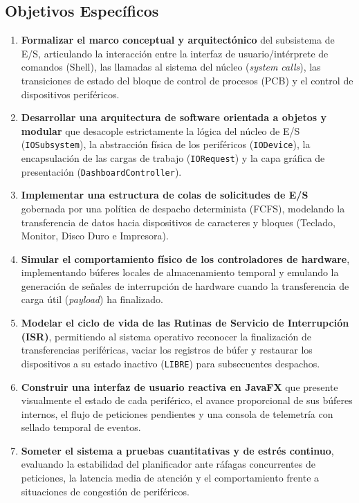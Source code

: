 \documentclass[11pt,letterpaper]{article}
\begin{document}
\subsection{Objetivos Específicos}
\begin{enumerate}
    \item \textbf{Formalizar el marco conceptual y arquitectónico} del subsistema de E/S, articulando la interacción entre la interfaz de usuario/intérprete de comandos (Shell), las llamadas al sistema del núcleo (\textit{system calls}), las transiciones de estado del bloque de control de procesos (PCB) y el control de dispositivos periféricos.
    \item \textbf{Desarrollar una arquitectura de software orientada a objetos y modular} que desacople estrictamente la lógica del núcleo de E/S (\texttt{IOSubsystem}), la abstracción física de los periféricos (\texttt{IODevice}), la encapsulación de las cargas de trabajo (\texttt{IORequest}) y la capa gráfica de presentación (\texttt{DashboardController}).
    \item \textbf{Implementar una estructura de colas de solicitudes de E/S} gobernada por una política de despacho determinista (FCFS), modelando la transferencia de datos hacia dispositivos de caracteres y bloques (Teclado, Monitor, Disco Duro e Impresora).
    \item \textbf{Simular el comportamiento físico de los controladores de hardware}, implementando búferes locales de almacenamiento temporal y emulando la generación de señales de interrupción de hardware cuando la transferencia de carga útil (\textit{payload}) ha finalizado.
    \item \textbf{Modelar el ciclo de vida de las Rutinas de Servicio de Interrupción (ISR)}, permitiendo al sistema operativo reconocer la finalización de transferencias periféricas, vaciar los registros de búfer y restaurar los dispositivos a su estado inactivo (\texttt{LIBRE}) para subsecuentes despachos.
    \item \textbf{Construir una interfaz de usuario reactiva en JavaFX} que presente visualmente el estado de cada periférico, el avance proporcional de sus búferes internos, el flujo de peticiones pendientes y una consola de telemetría con sellado temporal de eventos.
    \item \textbf{Someter el sistema a pruebas cuantitativas y de estrés continuo}, evaluando la estabilidad del planificador ante ráfagas concurrentes de peticiones, la latencia media de atención y el comportamiento frente a situaciones de congestión de periféricos.
\end{enumerate}
\end{document}
